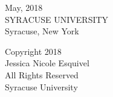 \documentclass[hyperpdf,bindnopdf,usenames,dvipsnames,svgnames,table,longbibliography]{hepthesis}
\begin{document}
\begin{frontmatter}
\begin{center}
{
\vspace{1.5cm}
}
May, 2018\\
SYRACUSE UNIVERSITY\\ 
Syracuse, New York\\

\end{center}
\thispagestyle{empty}
\let\cleardoublepage\clearpage

\vspace*{5cm}
\begin{center}
    Copyright 2018\\
    Jessica Nicole Esquivel\\
    All Rights Reserved\\
    Syracuse University\\
\end{center}
\thispagestyle{empty}
\let\cleardoublepage\clearpage

 
  
\end{frontmatter}

\begin{mainmatter}
  
  
  
  
  
  
  
  
  
\end{mainmatter}

%  

\begin{backmatter}
  
\end{backmatter}

\end{document}
